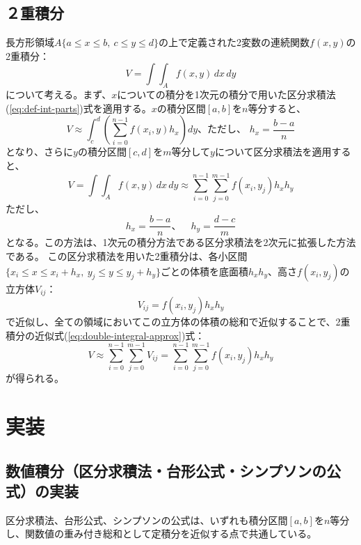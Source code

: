\documentclass[12pt,a4paper]{ltjsreport}
\begin{document}
\subsection{２重積分}
長方形領域$A\{a\le x\le b,\ c\le y\le d\}$の上で定義された2変数の連続関数$f(x,y)$の2重積分：
\begin{equation}\label{eq:double-integral}
V = \int\!\!\int_{A} f(x,y)\,dx\,dy
\end{equation}
について考える。まず、$x$についての積分を1次元の積分で用いた区分求積法(\ref{eq:def-int-parts})式を適用する。$x$の積分区間$[a,b]$を$n$等分すると、
\begin{equation}
V \approx \int_{c}^{d}\left(\sum_{i=0}^{n-1}f(x_i,y)h_x\right)dy\text{、ただし、 } h_x = \frac{b-a}{n}
\end{equation}
となり、さらに$y$の積分区間$[c,d]$を$m$等分して$y$について区分求積法を適用すると、
\begin{equation}\label{eq:double-integral-approx}
V = \int\!\!\int_{A} f(x,y)\,dx\,dy \approx \sum_{i=0}^{n-1}\sum_{j=0}^{m-1}f(x_i,y_j)h_x h_y
\end{equation}
ただし、
\begin{equation}
h_x = \frac{b-a}{n}\text{、}\quad h_y = \frac{d-c}{m}
\end{equation}
となる。この方法は、1次元の積分方法である区分求積法を2次元に拡張した方法である。
この区分求積法を用いた2重積分は、各小区間$\{x_i\le x\le x_i+h_x,\ y_j\le y\le y_j+h_y\}$ごとの体積を底面積$h_xh_y$、高さ$f(x_i,y_j)$の立方体$V_{ij}$：
\begin{equation}
V_{ij} = f(x_i,y_j)h_x h_y
\end{equation}
で近似し、全ての領域においてこの立方体の体積の総和で近似することで、2重積分の近似式(\ref{eq:double-integral-approx})式：
\begin{equation}
V \approx \sum_{i=0}^{n-1}\sum_{j=0}^{m-1}V_{ij} = \sum_{i=0}^{n-1}\sum_{j=0}^{m-1}f(x_i,y_j)h_x h_y
\end{equation}
が得られる。

\newpage
\section{実装}

\newpage
\subsection{数値積分（区分求積法・台形公式・シンプソンの公式）の実装}
区分求積法、台形公式、シンプソンの公式は、いずれも積分区間$[a,b]$を$n$等分し、関数値の重み付き総和として定積分を近似する点で共通している。
\end{document}
